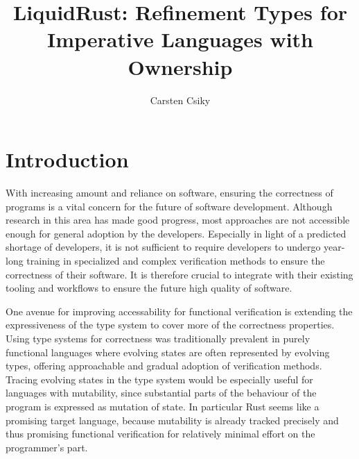 \documentclass[twoside, english]{sdqthesis}
\author{Carsten Csiky}
\title{LiquidRust: Refinement Types for Imperative Languages with Ownership}
\theoremstyle{definition}
\begin{document}
\setpdf

\maketitle

\frontmatter



\setcounter{page}{1}

 


\tableofcontents

\listoffigures
\listoftables
\listoflistings


\mainmatter

\iftrue %
\chapter{Introduction}


With increasing amount and reliance on software, ensuring the correctness of programs is a vital concern for the future of software development.
Although research in this area has made good progress, most approaches are not accessible enough for general adoption by the developers. Especially in light of a predicted shortage of developers\cite{breaux_2021_2021-1}, it is not sufficient to require developers to undergo year-long training in specialized and complex verification methods to ensure the correctness of their software. It is therefore crucial to integrate with their existing tooling and workflows to ensure the future high quality of software.

One avenue for improving accessability for functional verification is extending the expressiveness of the type system to cover more of the correctness properties.
Using type systems for correctness was traditionally prevalent in purely functional languages where evolving states are often represented by evolving types, offering approachable and gradual adoption of verification methods. Tracing evolving states in the type system would be especially useful for languages with mutability, since substantial parts of the behaviour of the program is expressed as mutation of state. In particular Rust seems like a promising target language, because mutability is already tracked precisely and thus promising functional verification for relatively minimal effort on the programmer's part.
\end{document}
